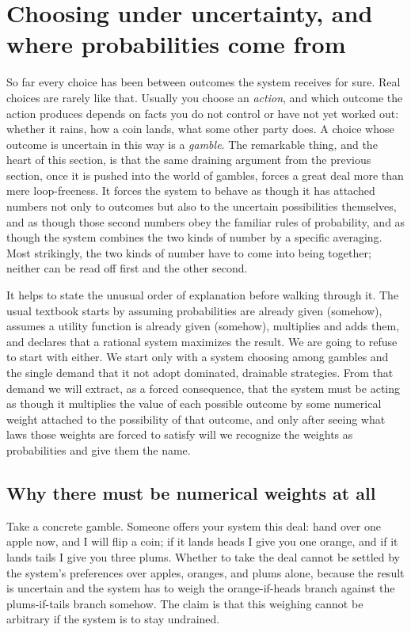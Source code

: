 \documentclass[10pt]{article}
\theoremstyle{definition}
\theoremstyle{remark}
\begin{document}
\section{Choosing under uncertainty, and where probabilities come from}
\label{sec:probabilities}

So far every choice has been between outcomes the system receives for sure. Real choices are rarely like that. Usually you choose an \emph{action}, and which outcome the action produces depends on facts you do not control or have not yet worked out: whether it rains, how a coin lands, what some other party does. A choice whose outcome is uncertain in this way is a \emph{gamble}. The remarkable thing, and the heart of this section, is that the same draining argument from the previous section, once it is pushed into the world of gambles, forces a great deal more than mere loop-freeness. It forces the system to behave as though it has attached numbers not only to outcomes but also to the uncertain possibilities themselves, and as though those second numbers obey the familiar rules of probability, and as though the system combines the two kinds of number by a specific averaging. Most strikingly, the two kinds of number have to come into being together; neither can be read off first and the other second.

It helps to state the unusual order of explanation before walking through it. The usual textbook starts by assuming probabilities are already given (somehow), assumes a utility function is already given (somehow), multiplies and adds them, and declares that a rational system maximizes the result. We are going to refuse to start with either. We start only with a system choosing among gambles and the single demand that it not adopt dominated, drainable strategies. From that demand we will extract, as a forced consequence, that the system must be acting as though it multiplies the value of each possible outcome by some numerical weight attached to the possibility of that outcome, and only after seeing what laws those weights are forced to satisfy will we recognize the weights as probabilities and give them the name.

\subsection{Why there must be numerical weights at all}

Take a concrete gamble. Someone offers your system this deal: hand over one apple now, and I will flip a coin; if it lands heads I give you one orange, and if it lands tails I give you three plums. Whether to take the deal cannot be settled by the system's preferences over apples, oranges, and plums alone, because the result is uncertain and the system has to weigh the orange-if-heads branch against the plums-if-tails branch somehow. The claim is that this weighing cannot be arbitrary if the system is to stay undrained.
\end{document}
